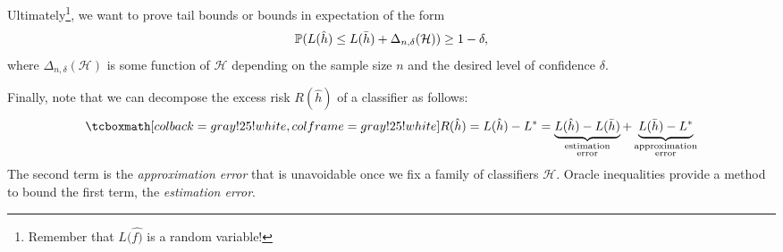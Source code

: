 Ultimately\footnote{Remember that $L(\hat{f)}$ is a random variable!}, we want to prove tail bounds or bounds in expectation of the form
\[
    \operatorname{\mathbb{P}}(L(\hat{h}) \leq L(\bar{h}) + \Delta_{n, \delta}(\mathcal{H})) \geq 1 - \delta,
\]
where $\Delta_{n, \delta}(\mathcal{H})$ is some function of $\mathcal{H}$ depending on the sample size $n$ and the desired level of confidence $\delta$.

Finally, note that we can decompose the excess risk $R(\hat{h})$ of a classifier as follows:
\[
    \highlightMath{
        R(\hat{h}) = L(\hat{h}) - L^* = \underbrace{L(\hat{h}) - L(\bar{h})}_{\substack{\text{estimation} \\ \text{error}}} + \underbrace{L(\bar{h}) - L^*}_{\substack{\text{approximation} \\ \text{error}}}
    }
\]
The second term is the \emph{approximation error} that is unavoidable once we fix a family of classifiers $\mathcal{H}$. Oracle inequalities provide a method to bound the first term, the \emph{estimation error}.
